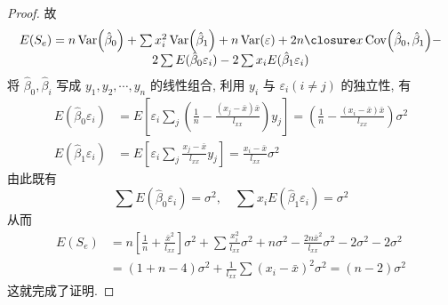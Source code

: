 \begin{proof}
    故
    \begin{equation*}
    \begin{array}{c}
    {E\left(S_{e}\right)=n \Var\left(\hat{\beta}_{0}\right)+\sum x_{i}^{2} \Var\left(\hat{\beta}_{1}\right)+n \Var(\varepsilon)+2 n \bar{x} \operatorname{Cov}\left(\hat{\beta}_{0}, \hat{\beta}_{1}\right)-} \\
    {2\sum E(\hat{\beta}_{0} \varepsilon_{i})-2\sum x_{i} E(\hat{\beta}_{1} \varepsilon_{i})}\end{array}
    \end{equation*}
    将 $\hat{\beta}_0, \hat{\beta}_i$ 写成 $y_1, y_2, \cdots, y_n$ 的线性组合, 利用 $y_i$ 与 $\varepsilon_i(i \neq j)$ 的独立性, 有
    \begin{equation*}
    \begin{split}
        E(\hat{\beta}_{0} \varepsilon_{i})& =E\left[\varepsilon_{i} \sum_{j}\left(\frac{1}{n}-\frac{\left(x_{j}-\bar{x}\right) \bar{x}}{l_{x x}}\right) y_{j}\right]=\left(\frac{1}{n}-\frac{\left(x_{i}-\bar{x}\right) \bar{x}}{l_{x x}}\right)\sigma^2\\
        E(\hat{\beta}_{1} \varepsilon_{i}) &=E\left[\varepsilon_{i} \sum_{j} \frac{x_{j}-\bar{x}}{l_{x x}} y_{j}\right]=\frac{x_{i}-\bar{x}}{l_{x x}}\sigma^2
    \end{split}
    \end{equation*}
    由此既有
    \begin{equation*}
   \sum E\left(\hat{\beta}_{0} \varepsilon_{i}\right)=\sigma^{2}, \quad\sum x_{i} E\left(\hat{\beta}_{1} \varepsilon_{i}\right)=\sigma^{2}
    \end{equation*}
    从而
    \begin{equation*}
    \begin{aligned} E\left(S_{e}\right) &=n\left[\frac{1}{n}+\frac{\bar{x}^{2}}{l_{x x}}\right]\sigma^2+\sum \frac{x_{i}^{2}}{l_{x x}}\sigma^{2} + n\sigma^2-\frac{2 n \bar{x}^{2}}{l_{x x}}\sigma^2-2\sigma^2-2\sigma^2 \\ &=(1+n-4)\sigma^2+\frac{1}{l_{x x}}\sum\left(x_{i}-\bar{x}\right)^{2}\sigma^2=(n-2)\sigma^2 \end{aligned}
    \end{equation*}
    这就完成了证明.
\end{proof}


